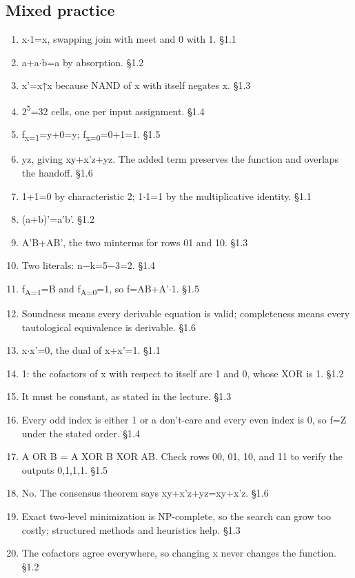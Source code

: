 \documentclass[11pt]{article}
\begin{document}
\begin{keepsection}\subsection{Mixed practice}

\begin{enumerate}
\item x\ensuremath{\cdot}1=x, swapping join with meet and 0 with 1. \hfill{\small\color{FAUblue}§1.1}
\item a+a\ensuremath{\cdot}b=a by absorption. \hfill{\small\color{FAUblue}§1.2}
\item x'=x↑x because NAND of x with itself negates x. \hfill{\small\color{FAUblue}§1.3}
\item 2\textsuperscript{5}=32 cells, one per input assignment. \hfill{\small\color{FAUblue}§1.4}
\item f\textsubscript{x=1}=y+0=y; f\textsubscript{x=0}=0+1=1. \hfill{\small\color{FAUblue}§1.5}
\item yz, giving xy+x'z+yz. The added term preserves the function and overlaps the handoff. \hfill{\small\color{FAUblue}§1.6}
\item 1+1=0 by characteristic 2; 1\ensuremath{\cdot}1=1 by the multiplicative identity. \hfill{\small\color{FAUblue}§1.1}
\item (a+b)'=a'b'. \hfill{\small\color{FAUblue}§1.2}
\item A'B+AB', the two minterms for rows 01 and 10. \hfill{\small\color{FAUblue}§1.3}
\item Two literals: n\ensuremath{-}k=5\ensuremath{-}3=2. \hfill{\small\color{FAUblue}§1.4}
\item f\textsubscript{A=1}=B and f\textsubscript{A=0}=1, so f=AB+A'\ensuremath{\cdot}1. \hfill{\small\color{FAUblue}§1.5}
\item Soundness means every derivable equation is valid; completeness means every tautological equivalence is derivable. \hfill{\small\color{FAUblue}§1.6}
\item x\ensuremath{\cdot}x'=0, the dual of x+x'=1. \hfill{\small\color{FAUblue}§1.1}
\item 1: the cofactors of x with respect to itself are 1 and 0, whose XOR is 1. \hfill{\small\color{FAUblue}§1.2}
\item It must be constant, as stated in the lecture. \hfill{\small\color{FAUblue}§1.3}
\item Every odd index is either 1 or a don’t-care and every even index is 0, so f=Z under the stated order. \hfill{\small\color{FAUblue}§1.4}
\item A OR B = A XOR B XOR AB. Check rows 00, 01, 10, and 11 to verify the outputs 0,1,1,1. \hfill{\small\color{FAUblue}§1.5}
\item No. The consensus theorem says xy+x'z+yz=xy+x'z. \hfill{\small\color{FAUblue}§1.6}
\item Exact two-level minimization is NP-complete, so the search can grow too costly; structured methods and heuristics help. \hfill{\small\color{FAUblue}§1.3}
\item The cofactors agree everywhere, so changing x never changes the function. \hfill{\small\color{FAUblue}§1.2}
\end{enumerate}


\end{keepsection}
\end{document}
